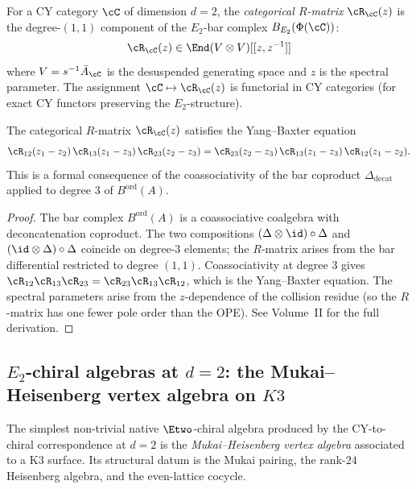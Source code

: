 \begin{definition}
\label{def:categorical-r-matrix}
For a CY category $\cC$ of dimension $d = 2$, the \emph{categorical
$R$-matrix} $\cR_\cC(z)$ is the degree-$(1,1)$ component of the
$E_2$-bar complex $B_{E_2}(\Phi(\cC))$:
\[
 \cR_\cC(z) \in \End(V \otimes V)[[z, z^{-1}]]
\]
where $V = s^{-1}\bar{A}_\cC$ is the desuspended generating space and
$z$ is the spectral parameter. The assignment $\cC \mapsto \cR_\cC(z)$
is functorial in CY categories (for exact CY functors preserving the
$E_2$-structure).
\end{definition}

\begin{proposition}
\label{prop:ybe-from-bar}
The categorical $R$-matrix $\cR_\cC(z)$ satisfies the Yang--Baxter
equation
\[
 \cR_{12}(z_1 - z_2) \, \cR_{13}(z_1 - z_3) \, \cR_{23}(z_2 - z_3)
 = \cR_{23}(z_2 - z_3) \, \cR_{13}(z_1 - z_3) \, \cR_{12}(z_1 - z_2).
\]
This is a formal consequence of the coassociativity of the bar coproduct
$\Delta_{\mathrm{decat}}$ applied to degree $3$ of $B^{\mathrm{ord}}(A)$.
\end{proposition}

\begin{proof}
The bar complex $B^{\mathrm{ord}}(A)$ is a coassociative coalgebra with
deconcatenation coproduct. The two compositions
$(\Delta \otimes \id) \circ \Delta$ and $(\id \otimes \Delta) \circ \Delta$
coincide on degree-$3$ elements; the $R$-matrix arises from the bar
differential restricted to degree $(1,1)$. Coassociativity at degree $3$
gives $\cR_{12}\cR_{13}\cR_{23} = \cR_{23}\cR_{13}\cR_{12}$, which is
the Yang--Baxter equation. The spectral parameters arise from the
$z$-dependence of the collision residue (so the $R$-matrix has one
fewer pole order than the OPE). See Volume~II for the
full derivation.
\end{proof}

\subsection{\texorpdfstring{$E_2$}{E-2}-chiral algebras at \texorpdfstring{$d = 2$}{d = 2}: the Mukai--Heisenberg vertex algebra on \texorpdfstring{$K3$}{K3}}
\label{subsec:mukai-heisenberg}

The simplest non-trivial native $\Etwo$-chiral algebra produced by the
CY-to-chiral correspondence at $d = 2$ is the \emph{Mukai--Heisenberg vertex
algebra} associated to a K3 surface. Its structural datum is the Mukai
pairing, the rank-$24$ Heisenberg algebra, and the even-lattice cocycle.

